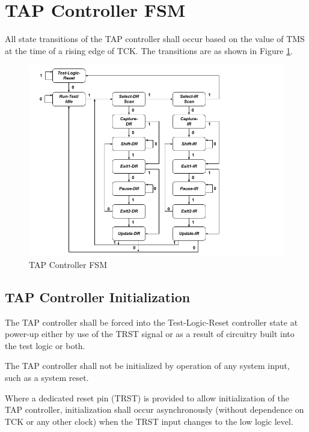 \section{TAP Controller FSM}
\label{subsec:tap-fsm}

All state transitions of the TAP controller shall occur based on the value of TMS at the time of a rising edge of TCK. The transitions are as shown in Figure \ref{fig:tap-controller-fsm}.

\vspace{1cm}
\begin{figure}[H]
    \centering
    \includegraphics[width = 18cm]{images/tap_state_diagram.png}
    \vspace{1cm}
    \caption{TAP Controller FSM}
    \label{fig:tap-controller-fsm}
\end{figure}

\newpage

\subsection{TAP Controller Initialization}
\label{subsec:tap-controller-initial}

The TAP controller shall be forced into the Test-Logic-Reset controller state at power-up either by use of the TRST signal or as a result of circuitry built into the test logic or both.

The TAP controller shall not be initialized by operation of any system input, such as a system reset.

Where a dedicated reset pin (TRST) is provided to allow initialization of the TAP controller, initialization shall occur asynchronously (without dependence on TCK or any other clock) when the TRST input changes to the low logic level.

